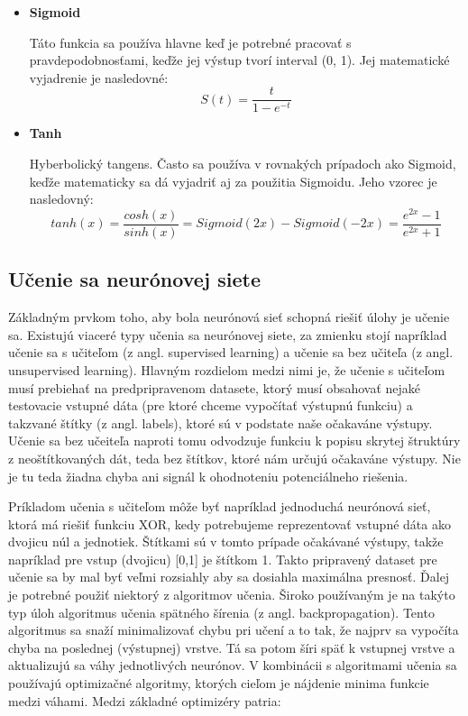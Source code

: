 \begin{itemize}
		\item{\textbf{Sigmoid}}
		
		Táto funkcia sa používa hlavne keď je potrebné pracovať s pravdepodobnosťami, keďže jej výstup tvorí interval (0, 1). Jej matematické vyjadrenie je nasledovné:
		\begin{equation}
		S(t) = \frac{t}{1-e^{-t}}
		\end{equation}
		
		\item {\textbf{Tanh}}
		
		Hyberbolický tangens. Často sa používa v rovnakých prípadoch ako Sigmoid, keďže matematicky sa dá vyjadriť aj za použitia Sigmoidu. Jeho vzorec je nasledovný:
		\begin{equation}
			tanh(x)=\frac{cosh(x)}{sinh(x)}=Sigmoid(2x)-Sigmoid(-2x)=\frac{e^{2x}-1}{e^{2x}+1}
		\end{equation}
	\end{itemize}
	
\subsection{Učenie sa neurónovej siete}
	
Základným prvkom toho, aby bola neurónová sieť schopná riešiť úlohy je učenie sa. Existujú viaceré typy učenia sa neurónovej siete, za zmienku stojí napríklad učenie sa s učiteľom (z angl. supervised learning) a učenie sa bez učiteľa (z angl. unsupervised learning\cite{unsupervised}). Hlavným rozdielom medzi nimi je, že učenie s učiteľom musí prebiehať na predpripravenom datasete, ktorý musí obsahovať nejaké testovacie vstupné dáta (pre ktoré chceme vypočítať výstupnú funkciu) a takzvané štítky (z angl. labels), ktoré sú v podstate naše očakaváne výstupy. Učenie sa bez učeiteľa naproti tomu odvodzuje funkciu k popisu skrytej štruktúry z neoštítkovaných dát, teda bez štítkov, ktoré nám určujú očakaváne výstupy. Nie je tu teda žiadna chyba ani signál k ohodnoteniu potenciálneho riešenia. 
	
	
Príkladom učenia s učiteľom môže byť napríklad jednoduchá neurónová sieť, ktorá má riešiť funkciu XOR\cite{neuron}, kedy potrebujeme reprezentovať vstupné dáta ako dvojicu núl a jednotiek. Štítkami sú v tomto prípade očakávané výstupy, takže napríklad pre vstup (dvojicu) [0,1] je štítkom 1. Takto pripravený dataset pre učenie sa by mal byť veľmi rozsiahly aby sa dosiahla maximálna presnosť. Ďalej je potrebné použiť niektorý z algoritmov učenia. Široko používaným je na takýto typ úloh algoritmus učenia spätného šírenia (z angl. backpropagation). Tento algoritmus sa snaží minimalizovať chybu pri učení a to tak, že najprv sa vypočíta chyba na poslednej (výstupnej) vrstve. Tá sa potom šíri späť k vstupnej vrstve a aktualizujú sa váhy jednotlivých neurónov.  V kombinácii s algoritmami učenia sa používajú optimizačné algoritmy, ktorých cieľom je nájdenie minima funkcie medzi váhami. Medzi základné optimizéry patria:

